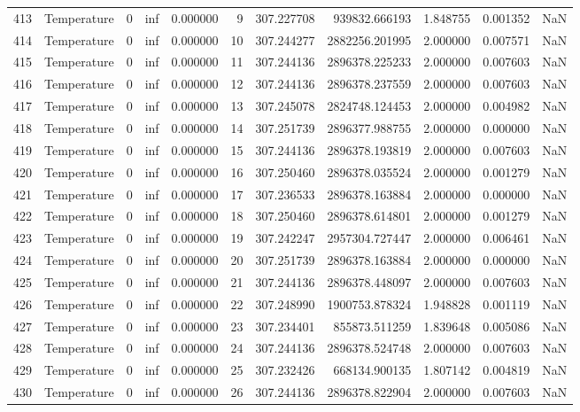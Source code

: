 \begin{tabular}{llrrrrrrrrr}
413 & Temperature & 0 & inf & 0.000000 & 9 & 307.227708 & 939832.666193 & 1.848755 & 0.001352 & NaN \\
414 & Temperature & 0 & inf & 0.000000 & 10 & 307.244277 & 2882256.201995 & 2.000000 & 0.007571 & NaN \\
415 & Temperature & 0 & inf & 0.000000 & 11 & 307.244136 & 2896378.225233 & 2.000000 & 0.007603 & NaN \\
416 & Temperature & 0 & inf & 0.000000 & 12 & 307.244136 & 2896378.237559 & 2.000000 & 0.007603 & NaN \\
417 & Temperature & 0 & inf & 0.000000 & 13 & 307.245078 & 2824748.124453 & 2.000000 & 0.004982 & NaN \\
418 & Temperature & 0 & inf & 0.000000 & 14 & 307.251739 & 2896377.988755 & 2.000000 & 0.000000 & NaN \\
419 & Temperature & 0 & inf & 0.000000 & 15 & 307.244136 & 2896378.193819 & 2.000000 & 0.007603 & NaN \\
420 & Temperature & 0 & inf & 0.000000 & 16 & 307.250460 & 2896378.035524 & 2.000000 & 0.001279 & NaN \\
421 & Temperature & 0 & inf & 0.000000 & 17 & 307.236533 & 2896378.163884 & 2.000000 & 0.000000 & NaN \\
422 & Temperature & 0 & inf & 0.000000 & 18 & 307.250460 & 2896378.614801 & 2.000000 & 0.001279 & NaN \\
423 & Temperature & 0 & inf & 0.000000 & 19 & 307.242247 & 2957304.727447 & 2.000000 & 0.006461 & NaN \\
424 & Temperature & 0 & inf & 0.000000 & 20 & 307.251739 & 2896378.163884 & 2.000000 & 0.000000 & NaN \\
425 & Temperature & 0 & inf & 0.000000 & 21 & 307.244136 & 2896378.448097 & 2.000000 & 0.007603 & NaN \\
426 & Temperature & 0 & inf & 0.000000 & 22 & 307.248990 & 1900753.878324 & 1.948828 & 0.001119 & NaN \\
427 & Temperature & 0 & inf & 0.000000 & 23 & 307.234401 & 855873.511259 & 1.839648 & 0.005086 & NaN \\
428 & Temperature & 0 & inf & 0.000000 & 24 & 307.244136 & 2896378.524748 & 2.000000 & 0.007603 & NaN \\
429 & Temperature & 0 & inf & 0.000000 & 25 & 307.232426 & 668134.900135 & 1.807142 & 0.004819 & NaN \\
430 & Temperature & 0 & inf & 0.000000 & 26 & 307.244136 & 2896378.822904 & 2.000000 & 0.007603 & NaN \\

\end{tabular}

